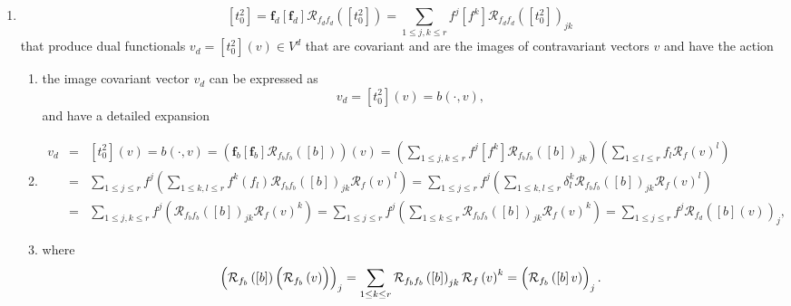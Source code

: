 \documentclass[aps,preprint]{revtex4}
\begin{document}
\begin{enumerate}
\begin{enumerate}
\item 
\begin{equation}
\left[ t_{0}^{2}\right] =\boldsymbol{f}_{d}\left[ \boldsymbol{f}_{d}\right] 
\mathcal{R}_{f_{d}f_{d}}\left( \left[ t_{0}^{2}\right] \right) =\sum_{1\leq
j,k\leq r}f^{j}\left[ f^{k}\right] \mathcal{R}_{f_{d}f_{d}}\left( \left[
t_{0}^{2}\right] \right) _{jk}
\end{equation}%
that produce dual functionals $v_{d}=\left[ t_{0}^{2}\right] \left( v\right)
\in V^{d}$ that are covariant and are the images of contravariant vectors $v$
and have the action

\begin{enumerate}
\item the image covariant vector $v_{d}$ can be expressed as 
\begin{equation}
v_{d}=\left[ t_{0}^{2}\right] \left( v\right) =b\left( \cdot ,v\right) ,
\end{equation}%
and have a detailed expansion

\item 
\begin{eqnarray}
v_{d} &=&\left[ t_{0}^{2}\right] \left( v\right) =b\left( \cdot ,v\right)
=\left( \boldsymbol{f}_{b}\overset{}{\left[ \boldsymbol{f}_{b}\right] 
\mathcal{R}_{f_{b}f_{b}}\left( \left[ b\right] \right) }\right) \left( 
\overset{}{v}\right) =\left( \sum_{1\leq j,k\leq r}f^{j}\left[ f^{k}\right] 
\mathcal{R}_{f_{b}f_{b}}\left( \left[ b\right] \right) _{jk}\right) \left(
\sum_{1\leq l\leq r}f_{l}\mathcal{R}_{f}\left( v\right) ^{l}\right) \\
&=&\sum_{1\leq j\leq r}f^{j}\left( \sum_{1\leq k,l\leq r}f^{k}\left(
f_{l}\right) \mathcal{R}_{f_{b}f_{b}}\left( \left[ b\right] \right) _{jk}%
\mathcal{R}_{f}\left( v\right) ^{l}\right) =\sum_{1\leq j\leq r}f^{j}\left(
\sum_{1\leq k,l\leq r}\delta _{l}^{k}\mathcal{R}_{f_{b}f_{b}}\left( \left[ b%
\right] \right) _{jk}\mathcal{R}_{f}\left( v\right) ^{l}\right) \\
&=&\sum_{1\leq j,k\leq r}f^{j}\left( \mathcal{R}_{f_{b}f_{b}}\left( \left[ b%
\right] \right) _{jk}\mathcal{R}_{f}\left( v\right) ^{k}\right) =\sum_{1\leq
j\leq r}f^{j}\left( \sum_{1\leq k\leq r}\mathcal{R}_{f_{b}f_{b}}\left( \left[
b\right] \right) _{jk}\mathcal{R}_{f}\left( v\right) ^{k}\right)
=\sum_{1\leq j\leq r}f^{j}\mathcal{R}_{f_{d}}\left( \overset{}{\left[ b%
\right] \left( v\right) }\right) _{j},
\end{eqnarray}

\item where 
\begin{equation}
\left( \mathcal{R}_{f_{b}}\left( \left[ b\right] \right) \left( \overset{}{%
\mathcal{R}_{f_{b}}\left( v\right) }\right) \right) _{j}=\sum_{1\leq k\leq r}%
\mathcal{R}_{f_{b}f_{b}}\left( \left[ b\right] \right) _{jk}\mathcal{R}%
_{f}\left( v\right) ^{k}=\left( \overset{}{\mathcal{R}_{f_{b}}\left( \left[ b%
\right] v\right) }\right) _{j}.
\end{equation}


\end{enumerate}
\end{enumerate}
\end{enumerate}
\end{document}
